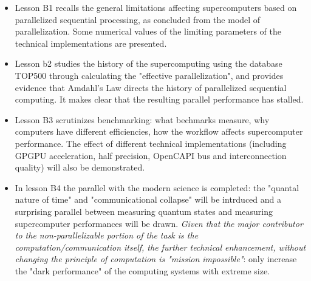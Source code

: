 {
	\begin{itemize}
		\item Lesson B1 recalls the general limitations affecting
		supercomputers based on parallelized sequential processing, 
		as concluded from the model of parallelization.
		Some numerical values of the limiting parameters of the technical implementations are presented.
		\item Lesson b2 studies the history of the supercomputing using
		the database TOP500 through calculating the "effective parallelization", and provides evidence that Amdahl's Law directs
		the history of parallelized sequential computing. It makes clear that the resulting parallel performance has stalled.
		\item Lesson B3 scrutinizes benchmarking: what bechmarks measure, 
		why computers have different efficiencies, how the workflow 
		affects supercomputer performance. The effect of different technical implementations
		(including GPGPU acceleration, half precision, OpenCAPI bus and interconnection quality) will also be demonstrated.
		\item In lesson B4 the parallel with the modern science is completed:
		the "quantal nature of time" and "communicational collapse" 
		will be intrduced and a surprising parallel between measuring
		quantum states and measuring supercomputer performances
		will be drawn. \textit{Given that the
		major contributor to the non-parallelizable portion of the task
		is the computation/communication itself, the further technical enhancement, without changing the principle of computation is "mission impossible"}: only increase the "dark performance" of the computing systems with extreme size.		
		
	\end{itemize}
}

